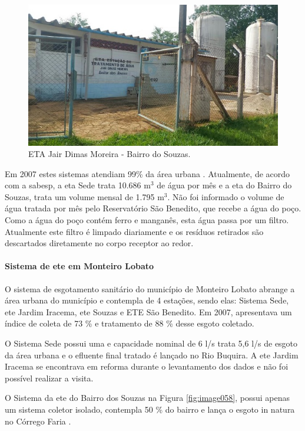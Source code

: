 \begin{figure}
	\centering
	\includegraphics[width=0.75\linewidth]{produtos/prodtres/image057}
	\caption{ETA Jair Dimas Moreira - Bairro do Souzas.}
	\label{fig:image057}
\end{figure}


Em 2007 estes sistemas atendiam 99\% da área urbana \cite{MonteiroLobato}. Atualmente, de acordo com a \gls{sabesp}, a \gls{eta} Sede trata 10.686 m$^{3}$ de água por mês e a \gls{eta} do Bairro do Souzas, trata um volume mensal de 1.795 m$^{3}$. Não foi informado o volume de água tratada por mês pelo Reservatório São Benedito, que recebe a água do poço. Como a água do poço contém ferro e manganês, esta água passa por um filtro. Atualmente este filtro é limpado diariamente e os resíduos retirados são descartados diretamente no corpo receptor ao redor.

\paragraph{\textbf{Sistema de \gls{ete} em Monteiro Lobato}}

O sistema de esgotamento sanitário do município de Monteiro Lobato abrange a área urbana do município e contempla de 4 estações, sendo elas: Sistema Sede, \gls{ete} Jardim Iracema, \gls{ete} Souzas e ETE São Benedito. Em 2007, apresentava um índice de coleta de 73 \% e tratamento de 88 \% desse esgoto coletado. 

O Sistema Sede possui uma e capacidade nominal de 6 l/s trata 5,6 l/s de esgoto da área urbana e o efluente final tratado é lançado no Rio Buquira. A \gls{ete} Jardim Iracema se encontrava em reforma durante o levantamento dos dados e não foi possível realizar a visita. 

O Sistema da \gls{ete} do Bairro dos Souzas na Figura \ref{fig:image058}, possui apenas um sistema coletor isolado, contempla 50 \% do bairro e lança o esgoto in natura no Córrego Faria \cite{MonteiroLobato}. 

